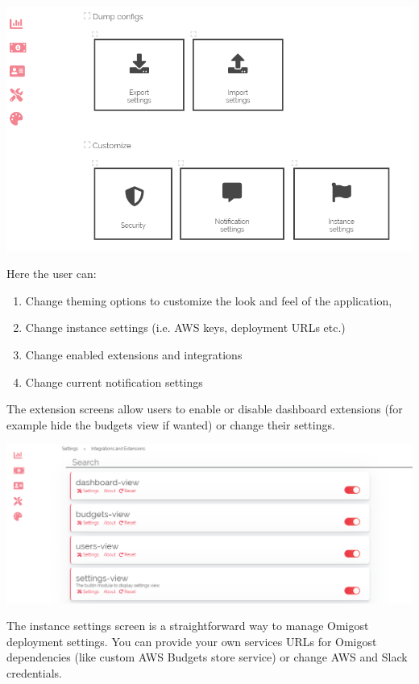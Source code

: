 \documentclass[licencjacka,en]{thesisclass}
\begin{document}
    \includegraphics[width=\textwidth] {imgs/screenshots/screen_customize.png}
    
    Here the user can:
    \begin{enumerate}
        \item Change theming options to customize the look and feel of the application,
        \item Change instance settings (i.e. AWS keys, deployment URLs etc.)
        \item Change enabled extensions and integrations
        \item Change current notification settings
    \end{enumerate}
    
    The extension screens allow users to enable or disable
    dashboard extensions (for example hide the budgets view if wanted) or change their settings.
    
    \includegraphics[width=\textwidth] {imgs/screenshots/screen_customize_extensions.png}
    
    The instance settings screen is a straightforward way to manage
    Omigost deployment settings. You can provide your own services URLs for Omigost dependencies
    (like custom AWS Budgets store service) or change AWS and Slack credentials.
    
\end{document}
